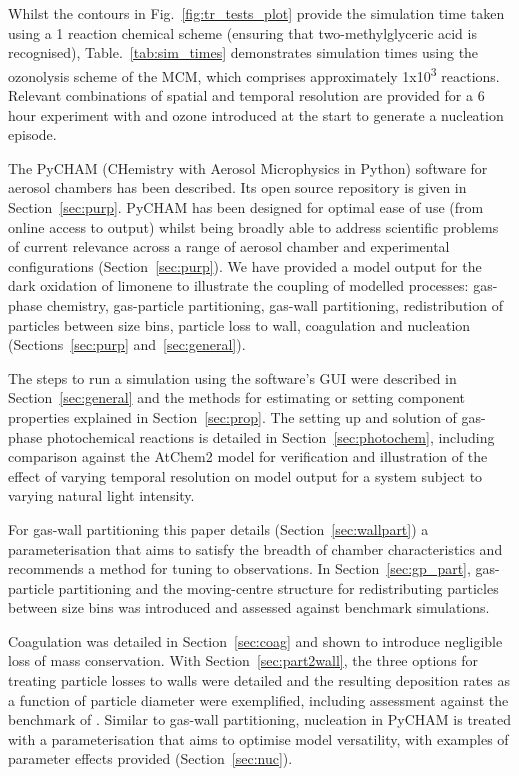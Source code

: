 \documentclass[gmd, manuscript]{copernicus}
\begin{document}
Whilst the contours in Fig.~\ref{fig:tr_tests_plot} provide the simulation time taken using a 1 reaction chemical scheme (ensuring that two-methylglyceric acid is recognised), Table.~\ref{tab:sim_times} demonstrates simulation times using the  ozonolysis scheme of the MCM, which comprises approximately \unit{1x10^{3}} reactions.  Relevant combinations of spatial and temporal resolution are provided for a 6 hour experiment with  and ozone introduced at the start to generate a nucleation episode.

\conclusions  %

The PyCHAM (CHemistry with Aerosol Microphysics in Python) software for aerosol chambers has been described.  Its open source repository is given in Section~\ref{sec:purp}.  PyCHAM has been designed for optimal ease of use (from online access to output) whilst being broadly able to address scientific problems of current relevance across a range of aerosol chamber and experimental configurations (Section~\ref{sec:purp}).  We have provided a model output for the dark oxidation of limonene to illustrate the coupling of modelled processes: gas-phase chemistry, gas-particle partitioning, gas-wall partitioning, redistribution of particles between size bins, particle loss to wall, coagulation and nucleation (Sections~\ref{sec:purp} and~\ref{sec:general}).

The steps to run a simulation using the software's GUI were described in Section~\ref{sec:general} and the methods for estimating or setting component properties explained in Section~\ref{sec:prop}.  The setting up and solution of gas-phase photochemical reactions is detailed in Section~\ref{sec:photochem}, including comparison against the AtChem2 model \citep{Sommariva2018} for verification and illustration of the effect of varying temporal resolution on model output for a system subject to varying natural light intensity.

For gas-wall partitioning this paper details (Section~\ref{sec:wallpart}) a parameterisation that aims to satisfy the breadth of chamber characteristics and recommends a method for tuning to observations.  In Section~\ref{sec:gp_part}, gas-particle partitioning and the moving-centre structure for redistributing particles between size bins was introduced and assessed against benchmark simulations.

Coagulation was detailed in Section~\ref{sec:coag} and shown to introduce negligible loss of mass conservation.  With Section~\ref{sec:part2wall}, the three options for treating particle losses to walls were detailed and the resulting deposition rates as a function of particle diameter were exemplified, including assessment against the benchmark of \citet{McMurry1985}.  Similar to gas-wall partitioning, nucleation in PyCHAM is treated with a parameterisation that aims to optimise model versatility, with examples of parameter effects provided (Section~\ref{sec:nuc}).
\end{document}
